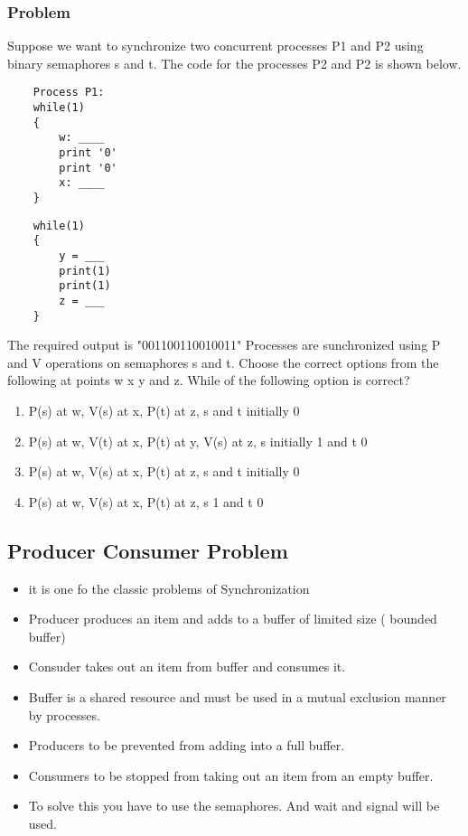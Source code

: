 \documentclass[11pt]{article}
\begin{document}
\subsubsection{Problem}
Suppose we want to synchronize two concurrent processes P1 and P2 using binary semaphores s and t. The code for the processes P2 and P2 is shown below.

\begin{verbatim}
	Process P1: 
	while(1)
	{
		w: ____
		print '0'
		print '0'
		x: ____
	}
\end{verbatim}

\begin{verbatim}
	while(1)
	{
		y = ___
		print(1)
		print(1)
		z = ___
	}
\end{verbatim}

The required output is "001100110010011" Processes are sunchronized using P and V operations on semaphores s and t. Choose the correct options from the following at points w x y and z. While of the following option is correct?
\begin{enumerate}
	\item P(s) at w, V(s) at x, P(t) at z, s and t initially 0
	\item P(s) at w, V(t) at x, P(t) at y, V(s) at z, s initially 1 and t 0
	\item P(s) at w, V(s) at x, P(t) at z, s and t initially 0
	\item P(s) at w, V(s) at x, P(t) at z, s 1 and t 0

\end{enumerate}

\subsection{Producer Consumer Problem}
\begin{itemize}
	\item it is one fo the classic problems of Synchronization
	\item Producer produces an item and adds to a buffer of limited size ( bounded buffer)
	\item Consuder takes out an item from buffer and consumes it. 
	\item Buffer is a shared resource and must be used in a mutual exclusion manner by processes. 
	\item Producers to be prevented from adding into a full buffer. 
	\item Consumers to be stopped from taking out an item from an empty buffer. 
	\item To solve this you have to use the semaphores. And wait and signal will be used. 
\end{itemize}
\end{document}
